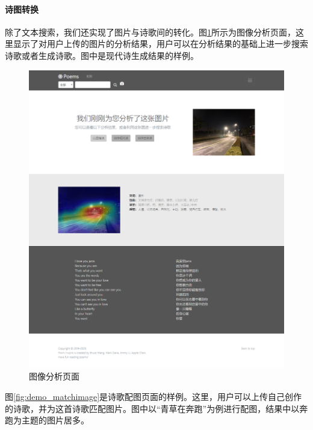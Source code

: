 \documentclass[a4paper, 10pt]{article}
\begin{document}
\paragraph*{诗图转换} 除了文本搜索，我们还实现了图片与诗歌间的转化。图\ref{fig:demo_analyze}所示为图像分析页面，这里显示了对用户上传的图片的分析结果，用户可以在分析结果的基础上进一步搜索诗歌或者生成诗歌。图中是现代诗生成结果的样例。

\begin{figure}[H]
\centering
\includegraphics[scale=0.48]{fig/demo_analyze.png}
\caption{图像分析页面}
\label{fig:demo_analyze}
\end{figure}

图\ref{fig:demo_matchimage}是诗歌配图页面的样例。这里，用户可以上传自己创作的诗歌，并为这首诗歌匹配图片。图中以“青草在奔跑”为例进行配图，结果中以奔跑为主题的图片居多。
\end{document}
